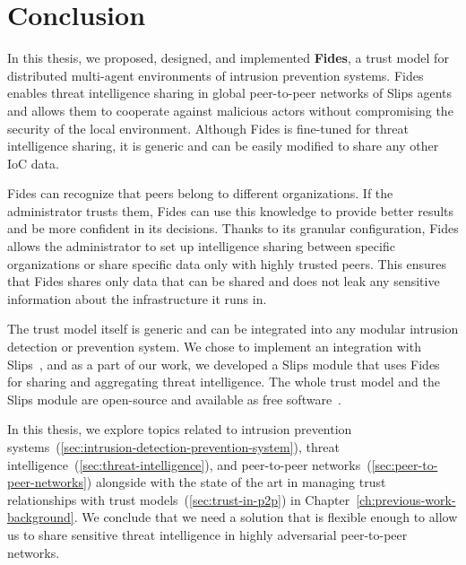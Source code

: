\chapter{Conclusion}
\label{ch:conclusion}

In this thesis, we proposed, designed, and implemented \textbf{Fides}, a trust model for distributed multi-agent environments of intrusion prevention systems.
Fides enables threat intelligence sharing in global peer-to-peer networks of Slips agents and allows them to cooperate against malicious actors without compromising the security of the local environment. 
Although Fides is fine-tuned for threat intelligence sharing, it is generic and can be easily modified to share any other IoC data.

Fides can recognize that peers belong to different organizations. If the administrator trusts them, Fides can use this knowledge to provide better results and be more confident in its decisions.
Thanks to its granular configuration, Fides allows the administrator to set up intelligence sharing between specific organizations or share specific data only with highly trusted peers.
This ensures that Fides shares only data that can be shared and does not leak any sensitive information about the infrastructure it runs in.

The trust model itself is generic and can be integrated into any modular intrusion detection or prevention system. We chose to implement an integration with Slips~\cite{slips}, and as a part of our work, we developed a Slips module that uses Fides for sharing and aggregating threat intelligence.
The whole trust model and the Slips module are open-source and available as free software~\cite{fidesGithub}.

In this thesis, we explore topics related to intrusion prevention systems~(\ref{sec:intrusion-detection-prevention-system}), threat intelligence~(\ref{sec:threat-intelligence}), and peer-to-peer networks~(\ref{sec:peer-to-peer-networks}) alongside with the state of the art in managing trust relationships with trust models~(\ref{sec:trust-in-p2p}) in Chapter~\ref{ch:previous-work-background}.
We conclude that we need a solution that is flexible enough to allow us to share sensitive threat intelligence in highly adversarial peer-to-peer networks.

